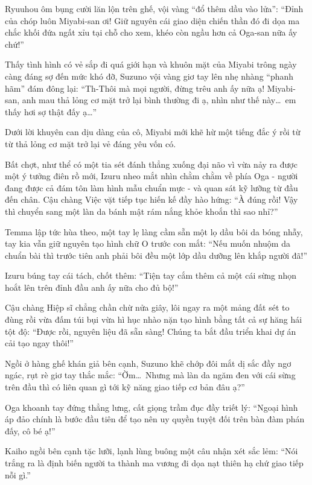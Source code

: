 \documentclass[../main.tex]{subfiles}
\begin{document}
Ryuuhou ôm bụng cười lăn lộn trên ghế, vội vàng ``đổ thêm dầu vào lửa'': ``Đỉnh của chóp luôn Miyabi-san ơi! Giữ nguyên cái giao diện chiến thần đó đi dọa ma chắc khối đứa ngất xỉu tại chỗ cho xem, khéo còn ngầu hơn cả Oga-san nữa ấy chứ!''

Thấy tình hình có vẻ sắp đi quá giới hạn và khuôn mặt của Miyabi trông ngày càng đáng sợ đến mức khó đỡ, Suzuno vội vàng giơ tay lên nhẹ nhàng ``phanh hãm'' đám đông lại: ``Th-Thôi mà mọi người, đừng trêu anh ấy nữa ạ! Miyabi-san, anh mau thả lỏng cơ mặt trở lại bình thường đi ạ, nhìn như thế này\dots\ em thấy hơi sợ thật đấy ạ\dots''

Dưới lời khuyên can dịu dàng của cô, Miyabi mới khẽ hừ một tiếng đắc ý rồi từ từ thả lỏng cơ mặt trở lại vẻ đáng yêu vốn có.

Bất chợt, như thể có một tia sét đánh thẳng xuống đại não vì vừa nảy ra được một ý tưởng điên rồ mới, Izuru nheo mắt nhìn chằm chằm về phía Oga - người đang được cả đám tôn làm hình mẫu chuẩn mực - và quan sát kỹ lưỡng từ đầu đến chân. Cậu chàng Việc vặt tiếp tục hiến kế đầy hào hứng: ``À đúng rồi! Vậy thì chuyển sang một làn da bánh mật rám nắng khỏe khoắn thì sao nhỉ?''

Temma lập tức hùa theo, một tay lẹ làng cầm sẵn một lọ dầu bôi da bóng nhẫy, tay kia vẫn giữ nguyên tạo hình chữ O trước con mắt: ``Nếu muốn nhuộm da chuẩn bài thì trước tiên anh phải bôi đều một lớp dầu dưỡng lên khắp người đã!''


Izuru búng tay cái tách, chốt thêm: ``Tiện tay cắm thêm cả một cái sừng nhọn hoắt lên trên đỉnh đầu anh ấy nữa cho đủ bộ!''

Cậu chàng Hiệp sĩ chẳng chần chừ nửa giây, lôi ngay ra một mảng đất sét to đùng rồi vừa đấm túi bụi vừa hì hục nhào nặn tạo hình bằng tất cả sự hăng hái tột độ: ``Được rồi, nguyên liệu đã sẵn sàng! Chúng ta bắt đầu triển khai dự án cải tạo ngay thôi!''

Ngồi ở hàng ghế khán giả bên cạnh, Suzuno khẽ chớp đôi mắt dị sắc đầy ngơ ngác, rụt rè giơ tay thắc mắc: ``Ờm\dots\ Nhưng mà làn da ngăm đen với cái sừng trên đầu thì có liên quan gì tới kỹ năng giao tiếp cơ bản đâu ạ?''

Oga khoanh tay đứng thẳng lưng, cất giọng trầm đục đầy triết lý: ``Ngoại hình áp đảo chính là bước đầu tiên để tạo nên uy quyền tuyệt đối trên bàn đàm phán đấy, cô bé ạ!''

Kaiho ngồi bên cạnh tặc lưỡi, lạnh lùng buông một câu nhận xét sắc lẻm: ``Nói trắng ra là định biến người ta thành ma vương đi dọa nạt thiên hạ chứ giao tiếp nỗi gì.''
\end{document}
